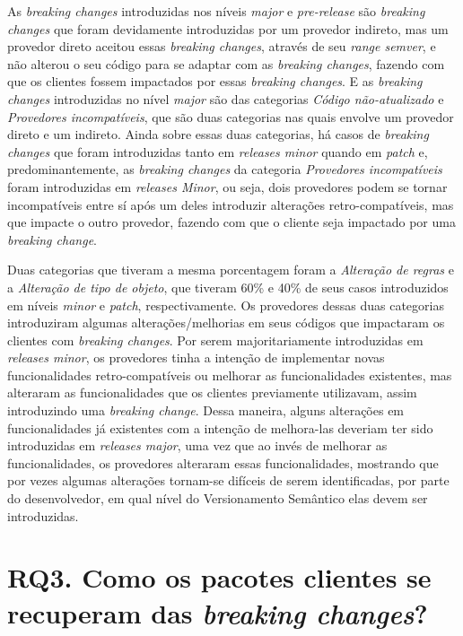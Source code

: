 As \textit{breaking changes} introduzidas nos níveis \textit{major} e \textit{pre-release} são \textit{breaking changes} que foram devidamente introduzidas por um provedor indireto, mas um provedor direto aceitou essas \textit{breaking changes}, através de seu \textit{range semver}, e  não alterou o seu código para se adaptar com as \textit{breaking changes}, fazendo com que os clientes fossem impactados por essas \textit{breaking changes}. E as \textit{breaking changes} introduzidas no nível \textit{major} são das categorias \textit{Código não-atualizado} e \textit{Provedores incompatíveis}, que são duas categorias nas quais envolve um provedor direto e um indireto. Ainda sobre essas duas categorias, há casos de \textit{breaking changes} que foram introduzidas tanto em \textit{releases minor} quando em \textit{patch} e, predominantemente,  as \textit{breaking changes} da categoria \textit{Provedores incompatíveis} foram introduzidas em \textit{releases Minor}, ou seja, dois provedores  podem se tornar incompatíveis entre sí após um deles introduzir alterações retro-compatíveis, mas que impacte o outro provedor, fazendo com que o cliente seja impactado por uma \textit{breaking change}.

Duas categorias que tiveram a mesma porcentagem foram a \textit{Alteração de regras} e a \textit{Alteração de tipo de objeto}, que tiveram 60\% e 40\% de seus casos introduzidos em níveis \textit{minor} e \textit{patch}, respectivamente. Os provedores dessas duas categorias introduziram algumas alterações/melhorias em seus códigos que impactaram os clientes com \textit{breaking changes}. Por serem majoritariamente introduzidas em \textit{releases minor}, os provedores tinha a intenção de implementar novas funcionalidades retro-compatíveis ou melhorar as funcionalidades existentes, mas alteraram as funcionalidades que os clientes previamente utilizavam, assim introduzindo uma \textit{breaking change}. Dessa maneira, alguns alterações em funcionalidades já existentes com a intenção de melhora-las deveriam ter sido introduzidas em \textit{releases major}, uma vez que ao invés de melhorar as funcionalidades, os provedores alteraram essas funcionalidades, mostrando que por vezes algumas alterações tornam-se difíceis de serem identificadas, por parte do desenvolvedor, em qual nível do Versionamento Semântico elas devem ser introduzidas.

\section{RQ3. Como os pacotes clientes se recuperam das \textit{breaking changes}?}


